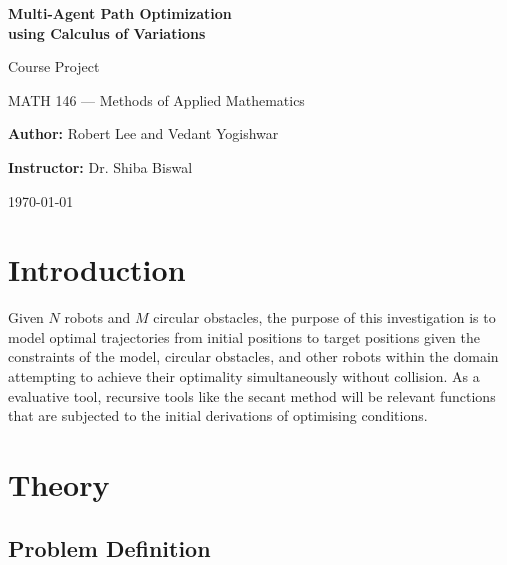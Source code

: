 \documentclass[11pt]{article}
\begin{document}
\begin{titlepage}
    \centering
    \null
    
    {\huge \textbf{Multi-Agent Path Optimization\\using Calculus of Variations}\par}
    \vspace{5mm}
    {\Large \large Course Project\par
    MATH 146 --- Methods of Applied Mathematics\par}
    \vspace{5mm}
    {\large \textbf{Author:} Robert Lee and Vedant Yogishwar\par
    \textbf{Instructor:} Dr. Shiba Biswal\par}
    
    
    {\large \today\par}
\end{titlepage}

\clearpage

\tableofcontents

\clearpage

\printunsrtglossary[type=symbols,style=long,title={List of Symbols}]

\section{Introduction}

Given \(N\) robots and \(M\) circular obstacles, the purpose of this investigation is to model optimal trajectories from initial positions to target positions given the constraints of the model, circular obstacles, and other robots within the domain attempting to achieve their optimality simultaneously without collision. As a evaluative tool, recursive tools like the secant method will be relevant functions that are subjected to the initial derivations of optimising conditions. 

\section{Theory}

\subsection{Problem Definition}
\end{document}
